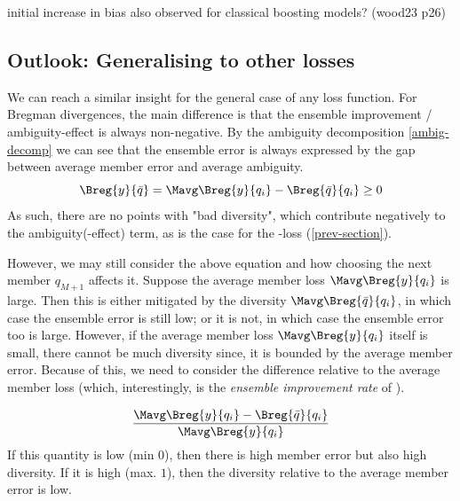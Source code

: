 \documentclass[
    a4paper, %
	fontsize=10pt, %
	twoside=false, %
]{kaobook}
\begin{document}
initial increase in bias also observed for classical boosting models? (wood23 p26)



\subsection{Outlook: Generalising to other losses}

We can reach a similar insight for the general case of any loss function.
For Bregman divergences, the main difference is that the ensemble improvement / ambiguity-effect
is always non-negative. By the ambiguity decomposition \ref{ambig-decomp} we can see that the ensemble error is always expressed by the gap between average member error and average ambiguity. 
$$
\Breg{y}{\bar{q}} = \Mavg \Breg{y}{q_{i}} - \Breg{\bar{q}}{q_{i}} \geq 0
$$
As such, there are no points with "bad diversity", which contribute negatively to the ambiguity(-effect) term, as is the case for the \zeroone-loss (\ref{prev-section}).

However, we may still consider the above equation and how choosing the next member $q_{M+1}$ affects it. Suppose the average member loss $\Mavg \Breg{y}{q_{i}}$ is large. Then this is either mitigated by the diversity $\Mavg \Breg{\bar{q}}{q_{i}}$, in which case the ensemble error is still low; or it is not, in which case the ensemble error too is large. 
However, if the average member loss $\Mavg\Breg{y}{q_i}$ itself is small, there cannot be much diversity since, it is bounded by the average member error.  Because of this, we need to consider the difference relative to the average member loss (which, interestingly, is the \textit{ensemble improvement rate} of \cite{theisen}).

$$
\frac{
\Mavg \Breg{y}{q_{i}} - \Breg{\bar{q}}{q_{i}}
}{
\Mavg \Breg{y}{q_i}
}
$$
If this quantity is low (min $0$), then there is high member error but also high diversity. If it is high (max. $1$), then the diversity relative to the average member error is low. 
\end{document}
